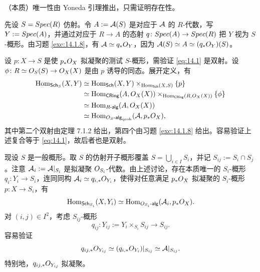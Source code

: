 \begin{sketch}
（本质）唯一性由 Yoneda 引理推出，只需证明存在性。

先设 $S=Spec(R)$ 仿射。令 $A:=\mathcal{A}(S)$ 是对应于 $\mathcal{A}$ 的 $R$-代数，写 $Y:=Spec(A)$，并通过对应于 $R\to A$ 的态射 $q\colon Spec(A)\to Spec(R)$ 把 $Y$ 视为 $S$-概形。由习题 \ref{exc:14.1.8}，有 $\mathcal{A}\simeq q_*O_Y$，因为 $\mathcal{A}(S)\simeq A\simeq(q_*O_Y)(S)$。

设 $p\colon X\to S$ 是使 $p_*O_X$ 拟凝聚的测试 $S$-概形，需验证 \eqref{eq:14.1} 是双射。设 $\phi\colon R\simeq O_S(S)\to O_X(X)$ 是由 $p$ 诱导的同态。展开定义，有
\[
\begin{aligned}
\operatorname{Hom}_{\mathsf{Sch}_S}(X,Y)&\simeq\operatorname{Hom}_{\mathsf{Sch}}(X,Y)\times_{\operatorname{Hom}_{\mathsf{Sch}}(X,S)}\{p\}\\
&\simeq\operatorname{Hom}_{\mathsf{CRing}}(A,O_X(X))\times_{\operatorname{Hom}_{\mathsf{CRing}}(R,O_X(X))}\{\phi\}\\
&\simeq\operatorname{Hom}_{R\text{-}\mathsf{alg}}(A,O_X(X))\\
&\simeq\operatorname{Hom}_{O_S\text{-}\mathsf{alg}_{\mathrm{qcoh}}}(\mathcal{A},p_*O_X),
\end{aligned}
\]
其中第二个双射由定理 7.1.2 给出，第四个由习题 \ref{exc:14.1.8} 给出。容易验证上述复合等于 \eqref{eq:14.1}，故后者也是双射。

现设 $S$ 是一般概形。取 $S$ 的仿射开子概形覆盖 $S=\bigcup_{i\in I}S_i$，并记 $S_{ij}:=S_i\cap S_j$。注意 $\mathcal{A}_i:=\mathcal{A}|_{S_i}$ 是拟凝聚 $O_{S_i}$-代数。由上述讨论，存在本质唯一的 $S_i$-概形 $q_i\colon Y_i\to S_i$，连同同构 $\mathcal{A}_i\simeq q_{i,*}O_{Y_i}$，使得对任意满足 $p_*O_X$ 拟凝聚的 $S_i$-概形 $p\colon X\to S_i$，有
\[
\operatorname{Hom}_{\mathsf{Sch}_{S_i}}(X,Y_i)\simeq\operatorname{Hom}_{O_{S_i}\text{-}\mathsf{alg}}(\mathcal{A}_i,p_*O_X).
\]
对 $(i,j)\in I^2$，考虑 $S_{ij}$-概形
\[
q_{ij}\colon Y_{ij}:=Y_i\times_{S_i}S_{ij}\to S_{ij}.
\]
容易验证
\[
q_{ij,*}O_{Y_{ij}}\simeq(q_{i,*}O_{Y_i})|_{S_{ij}}\simeq\mathcal{A}|_{S_{ij}}.
\]
特别地，$q_{ij,*}O_{Y_{ij}}$ 拟凝聚。


\end{sketch}
